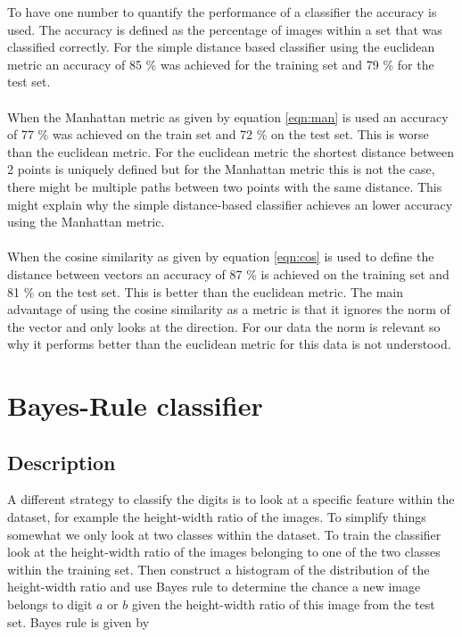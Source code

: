 \documentclass[10 pt, a4paper]{article}
\begin{document}
To have one number to quantify the performance of a classifier the accuracy is used. The accuracy is defined as the percentage of images within a set that was classified correctly. For the simple distance based classifier using the euclidean metric an accuracy of 85 \% was achieved for the training set and 79 \% for the test set.
\\
\\
When the Manhattan metric as given by equation \ref{eqn:man} is used an accuracy of 77 \% was achieved on the train set and 72 \% on the test set. This is worse than the euclidean metric. For the euclidean metric the shortest distance between 2 points is uniquely defined but for the Manhattan metric this is not the case, there might be multiple paths between two points with the same distance. This might explain why the simple distance-based classifier achieves an lower accuracy using the Manhattan metric.
\\
\\
When the cosine similarity as given by equation \ref{eqn:cos} is used to define the distance between vectors an accuracy of 87 \% is achieved on the training set and 81 \% on the test set. This is better than the euclidean metric. The main advantage of using the cosine similarity as a metric is that it ignores the norm of the vector and only looks at the direction. For our data the norm is relevant so why it performs better than the euclidean metric for this data is not understood.



\section{Bayes-Rule classifier}

\subsection{Description}

A different strategy to classify the digits is to look at a specific feature within the dataset, for example the height-width ratio of the images. To simplify things somewhat we only look at two classes within the dataset. To train the classifier look at the height-width ratio of the images belonging to one of the two classes within the training set. Then construct a histogram of the distribution of the height-width ratio and use Bayes rule to determine the chance a new image belongs to digit $a$ or $b$ given the height-width ratio of this image from the test set. Bayes rule is given by
\end{document}
